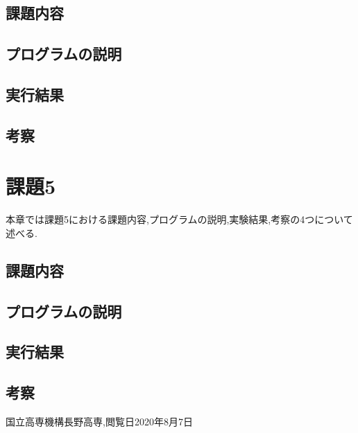 \documentclass[a4j]{jarticle}
\begin{document}
    \subsection{課題内容}
    \subsection{プログラムの説明}
    \subsection{実行結果}
    \subsection{考察}

    \section{課題5}
    本章では課題5における課題内容,プログラムの説明,実験結果,考察の4つについて述べる.
    \subsection{課題内容}
    \subsection{プログラムの説明}
    \subsection{実行結果}
    \subsection{考察}

        \begin{thebibliography}{9}
            国立高専機構長野高専,閲覧日2020年8月7日
          \end{thebibliography}
\end{document}
